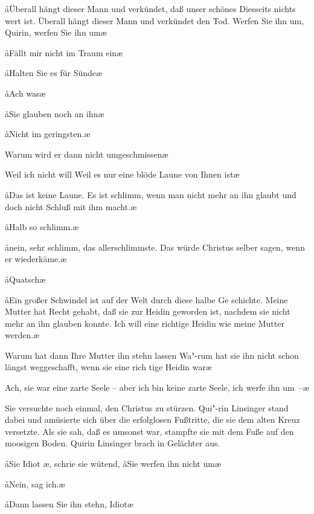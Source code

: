 \aa{}Überall hängt dieser Mann und verkündet, daß unser schönes
Diesseits nichts wert ist. Überall hängt dieser Mann und
verkündet den Tod. Werfen Sie ihn um, Quirin, werfen Sie
ihn um\ausr{}\ae{}

\aa{}Fällt mir nicht im Traum ein\ausr{}\ae{}

\aa{}Halten Sie es für Sünde\frag{}\ae{}

\aa{}Ach was\ausr{}\ae{}

\aa{}Sie glauben noch an ihn\frag{}\ae{}

\aa{}Nicht im geringsten.\ae{}

\aanah{}Warum wird er dann nicht umgeschmissen\frag{}\ae{}

\aanah{}Weil ich nicht will\ausr{} Weil es nur eine blöde Laune von
Ihnen ist\ausr{}\ae{}

\aa{}Das ist keine Laune. Es ist schlimm, wenn man nicht mehr
an ihn glaubt und doch nicht Schluß mit ihm macht.\ae{}

\aa{}Halb so schlimm.\ae{}

\aa{}nein, sehr schlimm, das allerschlimmste. Das würde Christus
selber sagen, wenn er wiederkäme.\ae{}

\aa{}Quatsch\ausr{}\ae{}

\aa{}Ein großer Schwindel ist auf der Welt durch diese halbe Ge\-%
schichte. Meine Mutter hat Recht gehabt, daß sie zur Heidin
geworden ist, nachdem sie nicht mehr an ihn glauben konnte.
Ich will eine richtige Heidin wie meine Mutter werden.\ae{}

\aanah{}Warum hat dann Ihre Mutter ihn stehn lassen\frag{} Wa"-rum
hat sie ihn nicht schon längst weggeschafft, wenn sie eine rich\-%
tige Heidin war\frag{}\ae{}

\aanah{}Ach, sie war eine zarte Seele -- aber ich bin keine zarte Seele,
ich werfe ihn um~--\ae{}

Sie versuchte noch einmal, den Christus zu stürzen. Qui"-rin
Linsinger stand dabei und amüsierte sich über die erfolglosen
Fußtritte, die sie dem alten Kreuz versetzte. Als sie sah, daß
es umsonst war, stampfte sie mit dem Fuße auf den moosigen
Boden. Quirin Linsinger brach in Gelächter aus.

\aa{}Sie Idiot\eingriff{Idiot\ae{}, ] Idiot,\ae{}}%
\ae{}, schrie sie wütend, \aa{}Sie werfen ihn nicht um\frag{}\ae{}

\aa{}Nein, sag ich.\ae{}

\aa{}Dann lassen Sie ihn stehn, Idiot\ausr{}\ae{}

